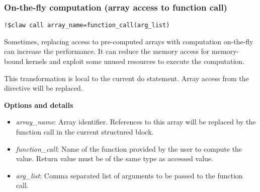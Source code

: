 \subsubsection{On-the-fly computation (array access to function call)}
\begin{lstlisting}
!$claw call array_name=function_call(arg_list)
\end{lstlisting}

Sometimes, replacing access to pre-computed arrays with computation on-the-fly
can increase the performance. It can reduce the memory access for memory-bound
kernels and exploit some unused resources to execute the computation.

This transformation is local to the current do statement. Array access from the
directive will be replaced.

\textbf{Options and details}
\begin{itemize}
\item \textit{array\_name}: Array identifier. References to this array will be
replaced by the function call in the current structured block.
\item \textit{function\_call}: Name of the function provided by the user to
compute the value. Return value must be of the same type as accessed value.
\item \textit{arg\_list}: Comma separated list of arguments to be passed to
the function call.
\end{itemize}
